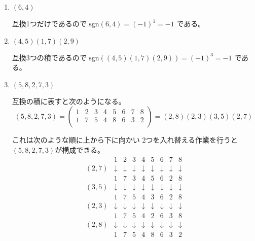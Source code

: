 \documentclass[12pt,b5paper]{ltjsarticle}
\begin{document}
\begin{enumerate}
\dotfill

      \begin{enumerate}
       \item
            $(6,4)$

            互換1つだけであるので
            $\mathrm{sgn}(6,4)=(-1)^1=-1$
            である。

       \item
            $(4,5)(1,7)(2,9)$

            互換3つの積であるので
            $\mathrm{sgn}( (4,5)(1,7)(2,9) )=(-1)^3=-1$
            である。

       \item
            $(5,8,2,7,3)$

            互換の積に表すと次のようになる。
            \begin{equation}
             (5,8,2,7,3)=
             \begin{pmatrix}
              1 & 2 & 3 & 4 & 5 & 6 & 7 & 8\\
              1 & 7 & 5 & 4 & 8 & 6 & 3 & 2\\
             \end{pmatrix}
             =
             (2,8)(2,3)(3,5)(2,7)
            \end{equation}

            これは次のような順に上から下に向かい
            2つを入れ替える作業を行うと
            $(5,8,2,7,3)$が構成できる。
            \begin{equation}
             \begin{matrix}
              & 1 & 2 & 3 & 4 & 5 & 6 & 7 & 8\\
              (2,7) & \downarrow & \downarrow & \downarrow & \downarrow & \downarrow & \downarrow & \downarrow & \downarrow \\
              & 1 & 7 & 3 & 4 & 5 & 6 & 2 & 8\\
              (3,5) & \downarrow & \downarrow & \downarrow & \downarrow & \downarrow & \downarrow & \downarrow & \downarrow \\
              & 1 & 7 & 5 & 4 & 3 & 6 & 2 & 8\\
              (2,3) & \downarrow & \downarrow & \downarrow & \downarrow & \downarrow & \downarrow & \downarrow & \downarrow \\
              & 1 & 7 & 5 & 4 & 2 & 6 & 3 & 8\\
              (2,8) & \downarrow & \downarrow & \downarrow & \downarrow & \downarrow & \downarrow & \downarrow & \downarrow \\
              & 1 & 7 & 5 & 4 & 8 & 6 & 3 & 2\\
             \end{matrix}
            \end{equation}


\end{enumerate}
\end{enumerate}
\end{document}
